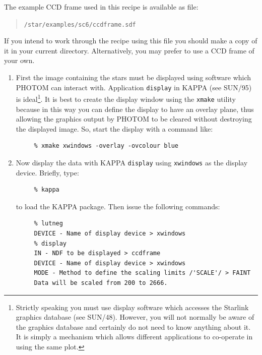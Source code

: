 \documentclass[twoside,11pt]{article}
\newcommand{\xref}[3]{#1}
\begin{document}
The example CCD frame used in this recipe is available as file:

\begin{verse}
{\tt /star/examples/sc6/ccdframe.sdf}
\end{verse}

If you intend to work through the recipe using this file you should make
a copy of it in your current directory.  Alternatively, you may prefer
to use a CCD frame of your own.

\begin{enumerate}

  \item First the image containing the stars must be displayed using
   software which PHOTOM can interact with.  Application
   \xref{{\tt display}}{sun95}{DISPLAY}
   in KAPPA (see \xref{SUN/95}{sun95}{}\cite{SUN95}) is
   ideal\footnote{Strictly speaking you must use display software
   which accesses the Starlink graphics database (see
   \xref{SUN/48}{sun48}{}\cite{SUN48}).  However, you will not normally
   be aware of the graphics database and certainly do not need to know
   anything about it.  It is simply a mechanism which allows different
   applications to co-operate in using the same plot.}.  It is best to
   create the display window using the {\tt xmake} utility because in this
   way you can define the display to have an overlay plane, thus allowing
   the graphics output by PHOTOM to be cleared without destroying the
   displayed image. So, start the display with a command like:

\begin{verbatim}
     % xmake xwindows -overlay -ovcolour blue
\end{verbatim}

  \item Now display the data with KAPPA
   \xref{{\tt display}}{sun95}{DISPLAY} using {\tt xwindows} as the
   display device.  Briefly, type:

\begin{verbatim}
     % kappa
\end{verbatim}

   to load the KAPPA package.  Then issue the following commands:

\begin{verbatim}
     % lutneg
     DEVICE - Name of display device > xwindows
     % display
     IN - NDF to be displayed > ccdframe
     DEVICE - Name of display device > xwindows
     MODE - Method to define the scaling limits /'SCALE'/ > FAINT
     Data will be scaled from 200 to 2666.
\end{verbatim}


\end{enumerate}
\end{document}

